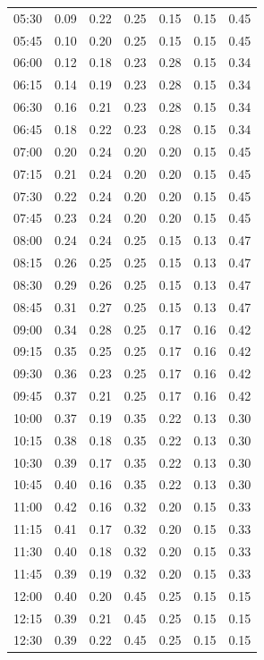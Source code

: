 \begin{longtable}{@{}lrrrrrr@{}}
05:30 & 0.09 & 0.22 & 0.25 & 0.15 & 0.15 & 0.45 \\
05:45 & 0.10 & 0.20 & 0.25 & 0.15 & 0.15 & 0.45 \\
06:00 & 0.12 & 0.18 & 0.23 & 0.28 & 0.15 & 0.34 \\
06:15 & 0.14 & 0.19 & 0.23 & 0.28 & 0.15 & 0.34 \\
06:30 & 0.16 & 0.21 & 0.23 & 0.28 & 0.15 & 0.34 \\
06:45 & 0.18 & 0.22 & 0.23 & 0.28 & 0.15 & 0.34 \\
07:00 & 0.20 & 0.24 & 0.20 & 0.20 & 0.15 & 0.45 \\
07:15 & 0.21 & 0.24 & 0.20 & 0.20 & 0.15 & 0.45 \\
07:30 & 0.22 & 0.24 & 0.20 & 0.20 & 0.15 & 0.45 \\
07:45 & 0.23 & 0.24 & 0.20 & 0.20 & 0.15 & 0.45 \\
08:00 & 0.24 & 0.24 & 0.25 & 0.15 & 0.13 & 0.47 \\
08:15 & 0.26 & 0.25 & 0.25 & 0.15 & 0.13 & 0.47 \\
08:30 & 0.29 & 0.26 & 0.25 & 0.15 & 0.13 & 0.47 \\
08:45 & 0.31 & 0.27 & 0.25 & 0.15 & 0.13 & 0.47 \\
09:00 & 0.34 & 0.28 & 0.25 & 0.17 & 0.16 & 0.42 \\
09:15 & 0.35 & 0.25 & 0.25 & 0.17 & 0.16 & 0.42 \\
09:30 & 0.36 & 0.23 & 0.25 & 0.17 & 0.16 & 0.42 \\
09:45 & 0.37 & 0.21 & 0.25 & 0.17 & 0.16 & 0.42 \\
10:00 & 0.37 & 0.19 & 0.35 & 0.22 & 0.13 & 0.30 \\
10:15 & 0.38 & 0.18 & 0.35 & 0.22 & 0.13 & 0.30 \\
10:30 & 0.39 & 0.17 & 0.35 & 0.22 & 0.13 & 0.30 \\
10:45 & 0.40 & 0.16 & 0.35 & 0.22 & 0.13 & 0.30 \\
11:00 & 0.42 & 0.16 & 0.32 & 0.20 & 0.15 & 0.33 \\
11:15 & 0.41 & 0.17 & 0.32 & 0.20 & 0.15 & 0.33 \\
11:30 & 0.40 & 0.18 & 0.32 & 0.20 & 0.15 & 0.33 \\
11:45 & 0.39 & 0.19 & 0.32 & 0.20 & 0.15 & 0.33 \\
12:00 & 0.40 & 0.20 & 0.45 & 0.25 & 0.15 & 0.15 \\
12:15 & 0.39 & 0.21 & 0.45 & 0.25 & 0.15 & 0.15 \\
12:30 & 0.39 & 0.22 & 0.45 & 0.25 & 0.15 & 0.15 \\

\end{longtable}
